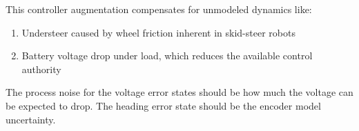 This controller augmentation compensates for unmodeled dynamics like:
\begin{enumerate}
  \item Understeer caused by wheel friction inherent in skid-steer robots
  \item Battery voltage drop under load, which reduces the available control
    authority
\end{enumerate}
\begin{remark}
  The process noise for the voltage error states should be how much the voltage
  can be expected to drop. The heading error state should be the encoder
  \gls{model} uncertainty.
\end{remark}
